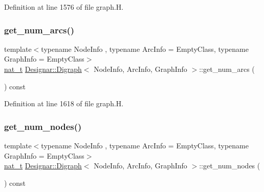 Definition at line 1576 of file graph.\+H.

\mbox{\label{class_designar_1_1_digraph_aa6289acc079b48c3ebaead44a974d716}} 
\subsubsection{\texorpdfstring{get\+\_\+num\+\_\+arcs()}{get\_num\_arcs()}}
{\footnotesize\ttfamily template$<$typename Node\+Info , typename Arc\+Info  = Empty\+Class, typename Graph\+Info  = Empty\+Class$>$ \\
\hyperlink{namespace_designar_aa72662848b9f4815e7bf31a7cf3e33d1}{nat\+\_\+t} \hyperlink{class_designar_1_1_digraph}{Designar\+::\+Digraph}$<$ Node\+Info, Arc\+Info, Graph\+Info $>$\+::get\+\_\+num\+\_\+arcs (\begin{DoxyParamCaption}{ }\end{DoxyParamCaption}) const\hspace{0.3cm}{\ttfamily [inline]}}



Definition at line 1618 of file graph.\+H.

\mbox{\label{class_designar_1_1_digraph_a7e2f0b56ec85cfd63ff757bef58ae702}} 
\subsubsection{\texorpdfstring{get\+\_\+num\+\_\+nodes()}{get\_num\_nodes()}}
{\footnotesize\ttfamily template$<$typename Node\+Info , typename Arc\+Info  = Empty\+Class, typename Graph\+Info  = Empty\+Class$>$ \\
\hyperlink{namespace_designar_aa72662848b9f4815e7bf31a7cf3e33d1}{nat\+\_\+t} \hyperlink{class_designar_1_1_digraph}{Designar\+::\+Digraph}$<$ Node\+Info, Arc\+Info, Graph\+Info $>$\+::get\+\_\+num\+\_\+nodes (\begin{DoxyParamCaption}{ }\end{DoxyParamCaption}) const\hspace{0.3cm}{\ttfamily [inline]}}



